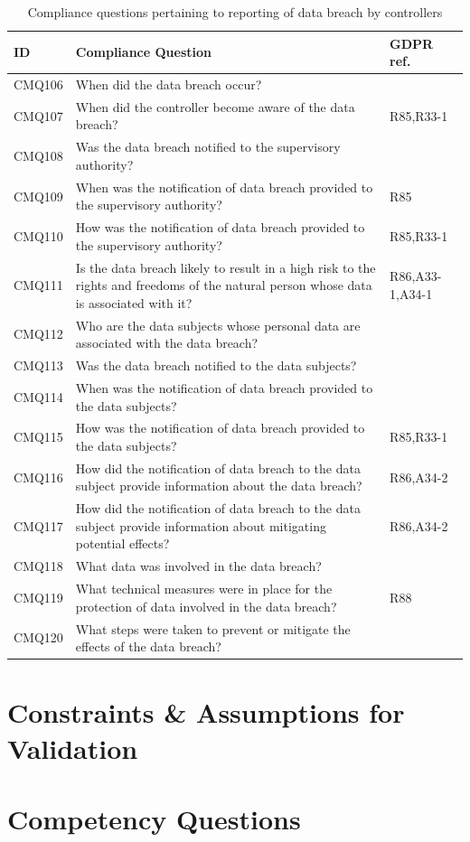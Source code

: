 \begin{table}
\small
\centering
\caption{Compliance questions pertaining to reporting of data breach by controllers}\label{table:info:compliance-data-breach}
\begin{tabularx}{\textwidth}{|l|X|l|}
\hline
\textbf{ID} & \textbf{Compliance Question} & \textbf{GDPR ref.} \\ \hline
CMQ106 & When did the data breach occur? &  \\ \hline
CMQ107 & When did the controller become aware of the data breach? & R85,R33-1 \\ \hline
CMQ108 & Was the data breach notified to the supervisory authority? &  \\ \hline
CMQ109 & When was the notification of data breach provided to the supervisory authority? & R85 \\ \hline
CMQ110 & How was the notification of data breach provided to the supervisory authority? & R85,R33-1 \\ \hline
CMQ111 & Is the data breach likely to result in a high risk to the rights and freedoms of the natural person whose data is associated with it? & R86,A33-1,A34-1 \\ \hline
CMQ112 & Who are the data subjects whose personal data are associated with the data breach? &  \\ \hline
CMQ113 & Was the data breach notified to the data subjects? &  \\ \hline
CMQ114 & When was the notification of data breach provided to the data subjects? &  \\ \hline
CMQ115 & How was the notification of data breach provided to the data subjects? & R85,R33-1 \\ \hline
CMQ116 & How did the notification of data breach to the data subject provide information about the data breach? & R86,A34-2 \\ \hline
CMQ117 & How did the notification of data breach to the data subject provide information about mitigating potential effects? & R86,A34-2 \\ \hline
CMQ118 & What data was involved in the data breach? &  \\ \hline
CMQ119 & What technical measures were in place for the protection of data involved in the data breach? & R88 \\ \hline
CMQ120 & What steps were taken to prevent or mitigate the effects of the data breach? &  \\ \hline
\end{tabularx}
\end{table}

\section{Constraints \& Assumptions for Validation}\label{sec:info:constraints}

\section{Competency Questions}\label{sec:info:competency-questions}


